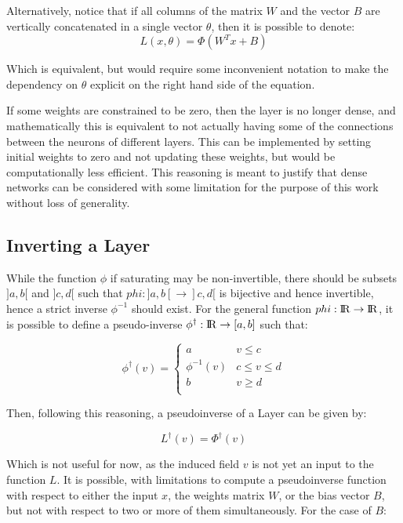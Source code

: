 \documentclass[10pt,journal,compsoc]{IEEEtran}
\newcommand{\reals}{{\rm I\!R}}
\begin{document}
Alternatively, notice that if all columns of the matrix $W$ and the vector $B$ are vertically concatenated in a single vector $\theta$, then it is possible to denote:
\begin{equation}
	L(x, \theta) = \Phi(W^Tx + B)
\end{equation}

Which is equivalent, but would require some inconvenient notation to make the dependency on $\theta$ explicit on the right hand side of the equation.

If some weights are constrained to be zero, then the layer is no longer dense, and mathematically this is equivalent to not actually having some of the connections between the neurons of different layers. This can be implemented by setting initial weights to zero and not updating these weights, but would be computationally less efficient. This reasoning is meant to justify that dense networks can be considered with some limitation for the purpose of this work without loss of generality.

\subsection{Inverting a Layer}\label{sec:invert_layer}
While the function $\phi$ if saturating may be non-invertible, there should be subsets $]a,b[$ and $]c, d[$ such that $phi:]a,b[\rightarrow]c, d[$ is bijective and hence invertible, hence a strict inverse $\phi^{-1}$ should exist. For the general function $phi:\reals\rightarrow\reals$, it is possible to define a pseudo-inverse $\phi^\dagger:\reals \rightarrow [a,b]$ such that:

\begin{equation}
	\phi^\dagger(v) =   \left\{
	\begin{array}{ll}
		a & v \leq c \\
		\phi^{-1}(v) & c\leq v\leq d \\
		b & v \geq d \\
	\end{array} 
	\right.
\end{equation}

Then, following this reasoning, a pseudoinverse of a Layer can be given by:

\begin{equation}
	L^\dagger(v) = \Phi^\dagger(v)
\end{equation}

Which is not useful for now, as the induced field $v$ is not yet an input to the function $L$. It is possible, with limitations to compute a pseudoinverse function with respect to either the input $x$, the weights matrix $W$, or the bias vector $B$, but not with respect to two or more of them simultaneously. For the case of $B$:
\end{document}
